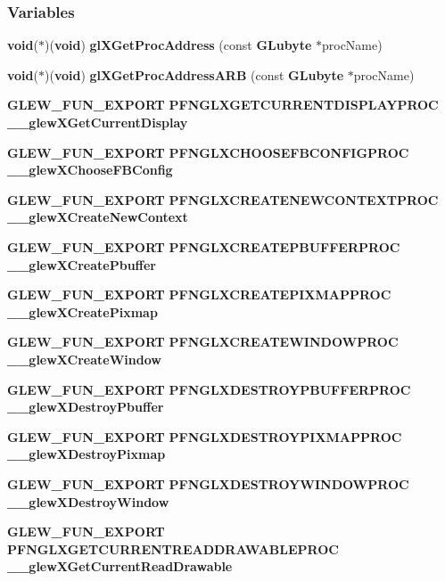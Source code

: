 \subsubsection*{Variables}
\begin{DoxyCompactItemize}
\item 
{\bf void}($\ast$)({\bf void}) {\bf gl\+X\+Get\+Proc\+Address} (const {\bf G\+Lubyte} $\ast$proc\+Name)
\item 
{\bf void}($\ast$)({\bf void}) {\bf gl\+X\+Get\+Proc\+Address\+A\+RB} (const {\bf G\+Lubyte} $\ast$proc\+Name)
\item 
{\bf G\+L\+E\+W\+\_\+\+F\+U\+N\+\_\+\+E\+X\+P\+O\+RT} {\bf P\+F\+N\+G\+L\+X\+G\+E\+T\+C\+U\+R\+R\+E\+N\+T\+D\+I\+S\+P\+L\+A\+Y\+P\+R\+OC} {\bf \+\_\+\+\_\+glew\+X\+Get\+Current\+Display}
\item 
{\bf G\+L\+E\+W\+\_\+\+F\+U\+N\+\_\+\+E\+X\+P\+O\+RT} {\bf P\+F\+N\+G\+L\+X\+C\+H\+O\+O\+S\+E\+F\+B\+C\+O\+N\+F\+I\+G\+P\+R\+OC} {\bf \+\_\+\+\_\+glew\+X\+Choose\+F\+B\+Config}
\item 
{\bf G\+L\+E\+W\+\_\+\+F\+U\+N\+\_\+\+E\+X\+P\+O\+RT} {\bf P\+F\+N\+G\+L\+X\+C\+R\+E\+A\+T\+E\+N\+E\+W\+C\+O\+N\+T\+E\+X\+T\+P\+R\+OC} {\bf \+\_\+\+\_\+glew\+X\+Create\+New\+Context}
\item 
{\bf G\+L\+E\+W\+\_\+\+F\+U\+N\+\_\+\+E\+X\+P\+O\+RT} {\bf P\+F\+N\+G\+L\+X\+C\+R\+E\+A\+T\+E\+P\+B\+U\+F\+F\+E\+R\+P\+R\+OC} {\bf \+\_\+\+\_\+glew\+X\+Create\+Pbuffer}
\item 
{\bf G\+L\+E\+W\+\_\+\+F\+U\+N\+\_\+\+E\+X\+P\+O\+RT} {\bf P\+F\+N\+G\+L\+X\+C\+R\+E\+A\+T\+E\+P\+I\+X\+M\+A\+P\+P\+R\+OC} {\bf \+\_\+\+\_\+glew\+X\+Create\+Pixmap}
\item 
{\bf G\+L\+E\+W\+\_\+\+F\+U\+N\+\_\+\+E\+X\+P\+O\+RT} {\bf P\+F\+N\+G\+L\+X\+C\+R\+E\+A\+T\+E\+W\+I\+N\+D\+O\+W\+P\+R\+OC} {\bf \+\_\+\+\_\+glew\+X\+Create\+Window}
\item 
{\bf G\+L\+E\+W\+\_\+\+F\+U\+N\+\_\+\+E\+X\+P\+O\+RT} {\bf P\+F\+N\+G\+L\+X\+D\+E\+S\+T\+R\+O\+Y\+P\+B\+U\+F\+F\+E\+R\+P\+R\+OC} {\bf \+\_\+\+\_\+glew\+X\+Destroy\+Pbuffer}
\item 
{\bf G\+L\+E\+W\+\_\+\+F\+U\+N\+\_\+\+E\+X\+P\+O\+RT} {\bf P\+F\+N\+G\+L\+X\+D\+E\+S\+T\+R\+O\+Y\+P\+I\+X\+M\+A\+P\+P\+R\+OC} {\bf \+\_\+\+\_\+glew\+X\+Destroy\+Pixmap}
\item 
{\bf G\+L\+E\+W\+\_\+\+F\+U\+N\+\_\+\+E\+X\+P\+O\+RT} {\bf P\+F\+N\+G\+L\+X\+D\+E\+S\+T\+R\+O\+Y\+W\+I\+N\+D\+O\+W\+P\+R\+OC} {\bf \+\_\+\+\_\+glew\+X\+Destroy\+Window}
\item 
{\bf G\+L\+E\+W\+\_\+\+F\+U\+N\+\_\+\+E\+X\+P\+O\+RT} {\bf P\+F\+N\+G\+L\+X\+G\+E\+T\+C\+U\+R\+R\+E\+N\+T\+R\+E\+A\+D\+D\+R\+A\+W\+A\+B\+L\+E\+P\+R\+OC} {\bf \+\_\+\+\_\+glew\+X\+Get\+Current\+Read\+Drawable}

\end{DoxyCompactItemize}
